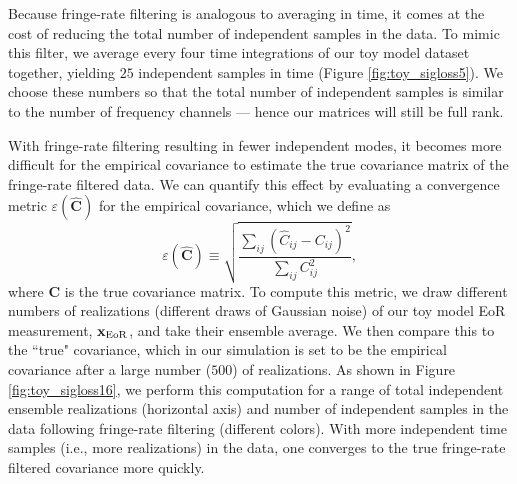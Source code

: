 \documentclass[preprint2,numberedappendix,tighten]{aastex6}  %
\newcommand{\C}{\mathbf{C}}
\newcommand{\Chat}{\mathbf{\widehat{C}}}
\newcommand{\cc}[1]{{\color{purple} \textbf{[CC: #1]}}}
\begin{document}
Because fringe-rate filtering is analogous to averaging in time, it comes at the cost of reducing the total number of independent samples in the data. To mimic this filter, we average every four time integrations of our toy model dataset together, yielding $25$ independent samples in time (Figure \ref{fig:toy_sigloss5}). We choose these numbers so that the total number of independent samples is similar to the number of frequency channels --- hence our matrices will still be full rank.

With fringe-rate filtering resulting in fewer independent modes, it becomes more difficult for the empirical covariance to estimate the true covariance matrix of the fringe-rate filtered data. We can quantify this effect by evaluating a convergence metric $\varepsilon(\Chat)$ for the empirical covariance, which we define as
\begin{equation}
\label{eq:converge}
\varepsilon (\Chat) \equiv \sqrt{\frac{\sum_{ij} (\widehat{C}_{ij} - {C}_{ij})^2}{\sum_{ij} {C}_{ij}^2}},
\end{equation}
where $\C$ is the true covariance matrix. To compute this metric, we draw different numbers of realizations (different draws of Gaussian noise) of our toy model EoR measurement, $\textbf{x}_{\rm EoR}$, and take their ensemble average. We then compare this to the ``true" covariance, which in our simulation is set to be the empirical covariance after a large number ($500$) of realizations. As shown in Figure \ref{fig:toy_sigloss16}, we perform this computation for a range of total independent ensemble realizations (horizontal axis) and number of independent samples in the data following fringe-rate filtering (different colors). With more independent time samples (i.e., more realizations) in the data, one converges to the true fringe-rate filtered covariance more quickly. 
\end{document}
